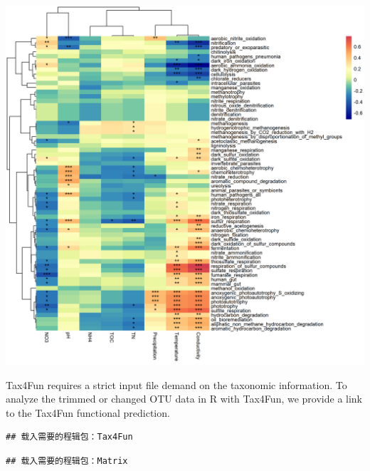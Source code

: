 \documentclass[
]{book}
\newenvironment{Shaded}{\begin{snugshade}}{\end{snugshade}}
\newcommand{\AttributeTok}[1]{\textcolor[rgb]{0.77,0.63,0.00}{#1}}
\newcommand{\CommentTok}[1]{\textcolor[rgb]{0.56,0.35,0.01}{\textit{#1}}}
\newcommand{\FunctionTok}[1]{\textcolor[rgb]{0.00,0.00,0.00}{#1}}
\newcommand{\NormalTok}[1]{#1}
\newcommand{\OtherTok}[1]{\textcolor[rgb]{0.56,0.35,0.01}{#1}}
\newcommand{\SpecialCharTok}[1]{\textcolor[rgb]{0.00,0.00,0.00}{#1}}
\newcommand{\StringTok}[1]{\textcolor[rgb]{0.31,0.60,0.02}{#1}}
\begin{document}
\begin{center}\includegraphics[width=800px]{Images/plot_func_perc_corr} \end{center}

Tax4Fun requires a strict input file demand on the taxonomic information.
To analyze the trimmed or changed OTU data in R with Tax4Fun, we provide a link to the Tax4Fun functional prediction.

\begin{Shaded}
\end{Shaded}

\begin{verbatim}
## 载入需要的程辑包：Tax4Fun
\end{verbatim}

\begin{verbatim}
## 载入需要的程辑包：Matrix
\end{verbatim}
\end{document}
